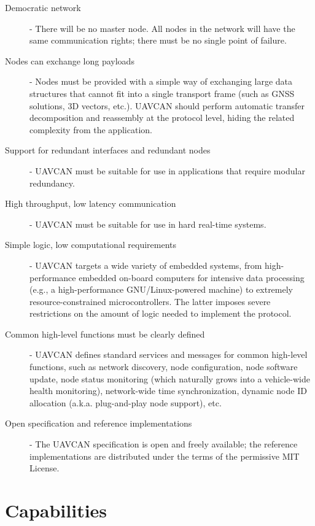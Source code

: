 \begin{description}
    \item[Democratic network] - There will be no master node.
    All nodes in the network will have the same communication rights; there must be no single point of failure.

    \item[Nodes can exchange long payloads] - Nodes must be provided with a simple way of exchanging large
    data structures that cannot fit into a single transport frame (such as GNSS solutions, 3D vectors, etc.).
    UAVCAN should perform automatic transfer decomposition and reassembly at the protocol level,
    hiding the related complexity from the application.

    \item[Support for redundant interfaces and redundant nodes] - UAVCAN must be suitable for use in
    applications that require modular redundancy.

    \item[High throughput, low latency communication] - UAVCAN must be suitable for use in
    hard real-time systems.

    \item[Simple logic, low computational requirements] - UAVCAN targets a wide variety of embedded systems,
    from high-performance embedded on-board computers for intensive data processing
    (e.g., a high-performance GNU/Linux-powered machine) to extremely resource-constrained microcontrollers.
    The latter imposes severe restrictions on the amount of logic needed to implement the protocol.

    \item[Common high-level functions must be clearly defined] - UAVCAN defines standard services
    and messages for common high-level functions, such as network discovery, node configuration,
    node software update, node status monitoring (which naturally grows into a vehicle-wide health monitoring),
    network-wide time synchronization, dynamic node ID allocation (a.k.a. plug-and-play node support), etc.

    \item[Open specification and reference implementations] - The UAVCAN specification is open and
    freely available; the reference implementations are distributed under the terms of the permissive MIT License.
\end{description}

\section{Capabilities}

